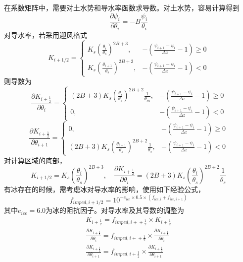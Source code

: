 在系数矩阵中，需要对土水势和导水率函数求导数。对土水势，容易计算得到
\begin{equation}
\frac{\partial \psi_{i}}{\partial \theta_{i}}=-B \frac{\psi_{i}}{\theta_{i}}
\end{equation}
对导水率，若采用迎风格式
\begin{equation}
    K_{i+1/2}=\left\{\begin{array}{rl} K_{ {s}}\left(\frac{\theta_{i}}{\theta_{ {s}}}\right)^{2 B+3},
       & -\left(\frac{\psi_{i+1}-\psi_{i}}{\Delta z}-1\right) \geq 0 \\ K_{ {s}}\left(\frac{\theta_{i+1}}{\theta_{ {s}}}\right)^{2 B+3},
       & -\left(\frac{\psi_{i+1}-\psi_{i}}{\Delta z}-1\right)<0\end{array}\right.
\end{equation}
则导数为
\begin{equation}
\frac{\partial K_{i+\frac{1}{2}}}{\partial \theta_{i}}=\begin{cases}
  (2 B+3) K_{ {s}}\left(\frac{\theta_{i}}{\theta_{s}}\right)^{2 B+2} 
    \frac{1}{\theta_{s a}}, & -\left(\frac{\psi_{i+1}-\psi_{i}}{\Delta z}-1\right) \geq 0 \\ 
   0, & -\left(\frac{\psi_{i+1}-\psi_{i}}{\Delta z}-1\right) < 0 
  \end{cases}
\end{equation}
\begin{equation}
\frac{\partial K_{i+\frac{1}{2}}}{\partial \theta_{i+1}}=\begin{cases}
     0, & -\left(\frac{\psi_{i+1}-\psi_{i}}{\Delta z}-1\right) \geq 0 \\
     (2 B+3) K_{ {s}}\left(\frac{\theta_{i+1}}{\theta_{ {s}}}\right)^{2 B+2} \frac{1}{\theta_{ {s}}}, & -\left(\frac{\psi_{i+1}-\psi_{i}}{\Delta z}-1\right) <0 
   \end{cases}
\end{equation}
对计算区域的底部，
\begin{equation}
K_{i+1 / 2}=K_{ {s}}\left(\frac{\theta_{i}}{\theta_{ {s}}}\right)^{2 B+3}, \quad \frac{\partial K_{i+\frac{1}{2}}}
{\partial \theta_{i}}=(2 B+3) K_{ {s}}\left(\frac{\theta_{i}}{\theta_{ {s}}}\right)^{2 B+2} \frac{1}{\theta_{s}}
\end{equation}
有冰存在的时候，需考虑冰对导水率的影响，使用如下经验公式，
\begin{equation}
    {f}_{{imped}, {i}+1 / 2}=10^{-e_{ice}\times 0.5\times\left(f_{i c e, i}+f_{i c e, i+1}\right)}
\end{equation}
其中$e_{ice}=6.0$为冰的阻抗因子。对导水率及其导数的调整为
\begin{equation}
\begin{array}{c}K_{i+\frac{1}{2}}={f}_{ {imped,i+ }+\frac{1}{2}} \times K_{i+\frac{1}{2}} \\ \frac{\partial K_{i+\frac{1}{2}}}{\partial \theta_{i}}
    ={f}_{ {imped,i+ }+\frac{1}{2}} \times \frac{\partial K_{i+\frac{1}{2}}}{\partial \theta_{i}} \\ \frac{\partial K_{i+\frac{1}{2}}}{\partial \theta_{i+1}}=
    {f}_{ {imped,i+ } \frac{1}{2}} \times \frac{\partial K_{i+\frac{1}{2}}}{\partial \theta_{i+1}}\end{array}
\end{equation}

